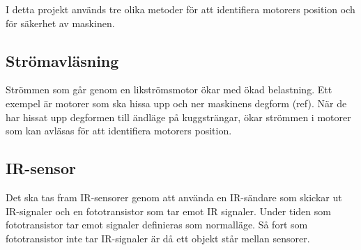 I detta projekt används tre olika metoder för att identifiera motorers position och för säkerhet av maskinen.
\subsection{Strömavläsning}
Strömmen som går genom en likströmsmotor ökar med ökad belastning. Ett exempel är motorer som ska hissa upp och ner maskinens degform (ref). När de har hissat upp degformen till ändläge på kuggsträngar, ökar strömmen i motorer som kan avläsas för att identifiera motorers position.
\subsection{IR-sensor}
Det ska tas fram IR-sensorer genom att använda en IR-sändare som skickar ut IR-signaler och en fototransistor som tar emot IR signaler. Under tiden som fototransistor tar emot signaler definieras som normalläge. Så fort som fototransistor inte tar IR-signaler är då ett objekt står mellan sensorer.

